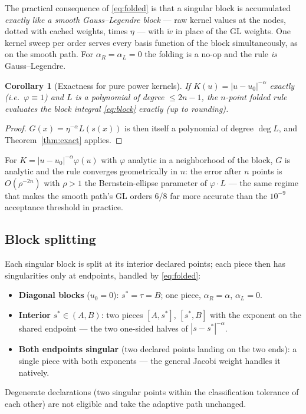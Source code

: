 \documentclass[11pt]{article}
\newtheorem{corollary}{Corollary}
\begin{document}
The practical consequence of \eqref{eq:folded} is that a singular block is
accumulated \emph{exactly like a smooth Gauss--Legendre block} --- raw
kernel values at the nodes, dotted with cached weights, times $\eta$ ---
with $\widetilde w$ in place of the GL weights. One kernel sweep per
order serves every basis function of the block simultaneously, as on the
smooth path. For $\alpha_R=\alpha_L=0$ the folding is a no-op and the rule
\emph{is} Gauss--Legendre.

\begin{corollary}[Exactness for pure power kernels]\label{cor:pure}
If $K(u)=|u-u_0|^{-\alpha}$ exactly (i.e.\ $\varphi\equiv1$) and $L$ is a
polynomial of degree $\le 2n-1$, the $n$-point folded rule evaluates the
block integral \eqref{eq:block} exactly (up to rounding).
\end{corollary}
\begin{proof}
$G(x) = \eta^{-\alpha}L(s(x))$ is then itself a polynomial of degree
$\deg L$, and Theorem~\ref{thm:exact} applies.
\end{proof}

For $K = |u-u_0|^{-\alpha}\varphi(u)$ with $\varphi$ analytic in a
neighborhood of the block, $G$ is analytic and the rule converges
geometrically in $n$: the error after $n$ points is
$O(\rho^{-2n})$ with $\rho>1$ the Bernstein-ellipse parameter of
$\varphi\cdot L$ --- the same regime that makes the smooth path's GL orders
6/8 far more accurate than the $10^{-9}$ acceptance threshold in practice.

\subsection{Block splitting}
Each singular block is split at its interior declared points; each piece
then has singularities only at endpoints, handled by \eqref{eq:folded}:
\begin{itemize}
  \item \textbf{Diagonal blocks} ($u_0=0$): $s^\ast=\tau=B$; one piece,
  $\alpha_R=\alpha$, $\alpha_L=0$.
  \item \textbf{Interior} $s^\ast\in(A,B)$: two pieces $[A,s^\ast]$,
  $[s^\ast,B]$ with the exponent on the shared endpoint --- the two
  one-sided halves of $|s-s^\ast|^{-\alpha}$.
  \item \textbf{Both endpoints singular} (two declared points landing on
  the two ends): a single piece with both exponents --- the general Jacobi
  weight handles it natively.
\end{itemize}
Degenerate declarations (two singular points within the classification
tolerance of each other) are not eligible and take the adaptive path
unchanged.
\end{document}
